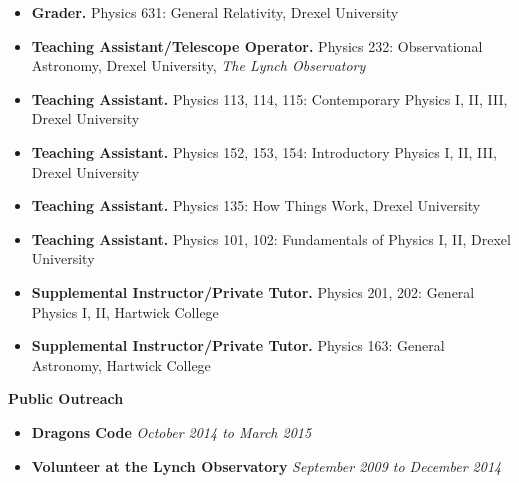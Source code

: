 \begin{vita}
\begin{itemize}
\item {\bf Grader.} Physics 631: General Relativity, Drexel University

\item {\bf Teaching Assistant/Telescope Operator.} Physics 232: Observational Astronomy,
  Drexel University, {\it The Lynch Observatory}

\item {\bf Teaching Assistant.} Physics 113, 114, 115: Contemporary
  Physics I, II, III, Drexel University

\item {\bf Teaching Assistant.} Physics 152, 153, 154: Introductory
  Physics I, II, III, Drexel University

\item {\bf Teaching Assistant.} Physics 135: How Things Work,
  Drexel University

\item {\bf Teaching Assistant.} Physics 101, 102: Fundamentals of
  Physics I, II, Drexel University

\item {\bf Supplemental Instructor/Private Tutor.} Physics 201, 202: General Physics I, II,
  Hartwick College

\item {\bf Supplemental Instructor/Private Tutor.} Physics 163: General Astronomy,
  Hartwick College

\end{itemize}


{\large\bf Public Outreach}
\begin{itemize} \itemsep -2pt
	\item \textbf{Dragons Code} \hfill \textit{October 2014 to March 2015}
	\item \textbf{Volunteer at the Lynch Observatory} \hfill \textit{September 2009 to December 2014}
\end{itemize}

\end{vita}
